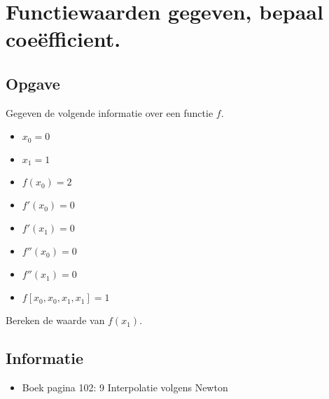 \documentclass[examenvragen.tex]{subfiles}
\begin{document}
\section{Functiewaarden gegeven, bepaal coe\"efficient.}
\subsection{Opgave}
Gegeven de volgende informatie over een functie $f$.
\begin{multicols}{4}
\begin{itemize}
\item $x_0 = 0$
\item $x_1 = 1$
\item $f(x_0) = 2$
\item $f'(x_0) = 0$
\item $f'(x_1) = 0$
\item $f''(x_0) = 0$
\item $f''(x_1) = 0$
\item $f[x_0,x_0,x_1,x_1] = 1$
\end{itemize}
\end{multicols}
Bereken de waarde van $f(x_1)$.

\subsection{Informatie}
\begin{itemize}
\item Boek pagina 102: 9 Interpolatie volgens Newton
\end{itemize}
\end{document}
